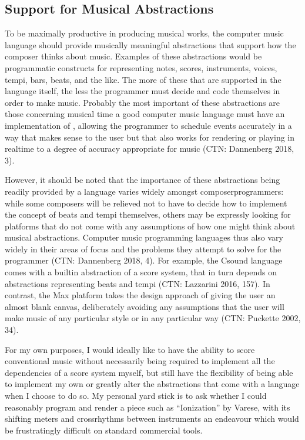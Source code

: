 \documentclass[letterpaper,10pt,english]{sphinxmanual}
\begin{document}
\subsection{Support for Musical Abstractions}
\label{\detokenize{background:support-for-musical-abstractions}}
\sphinxAtStartPar
To be maximally productive in producing musical works, the computer music language should provide
musically meaningful abstractions that support how the composer thinks about music.
Examples of these abstractions would be programmatic constructs for representing
notes, scores, instruments, voices, tempi, bars, beats, and the like.
The more of these that are supported in the language itself, the less the programmer
must decide and code themselves in order to make music.
Probably the most important of these abstractions are those concerning musical time
\sphinxhyphen{} a good computer music language must have an implementation of ,
allowing the programmer to schedule events accurately in a way that makes sense
to the user but that also works for rendering or playing in real\sphinxhyphen{}time to a degree of accuracy
appropriate for music (CTN: Dannenberg 2018, 3).

\sphinxAtStartPar
However, it should be noted that the importance of these abstractions being readily provided
by a language varies widely amongst composer\sphinxhyphen{}programmers:
while some composers will be relieved not to have to decide how to implement
the concept of beats and tempi themselves, others may be expressly looking for platforms
that do not come with any assumptions of how one might think about musical abstractions.
Computer music programming languages thus also vary widely in their areas
of focus and the problems they attempt to solve for the programmer (CTN: Dannenberg 2018, 4).
For example, the Csound language comes with a built\sphinxhyphen{}in abstraction of a score system,
that in turn depends on abstractions representing beats and tempi (CTN: Lazzarini 2016, 157).
In contrast, the Max platform takes the design approach of giving the user
an almost blank canvas, deliberately avoiding any assumptions that the user
will make music of any particular style or in any particular way (CTN: Puckette 2002, 34).

\sphinxAtStartPar
For my own purposes, I would ideally like to have the ability to score conventional music without
necessarily being required to implement all the dependencies of a score system myself,
but still have the flexibility of being able to implement my own or greatly alter the abstractions
that come with a language when I choose to do so.
My personal yard stick is to ask whether I could
reasonably program and render a piece such as “Ionization” by Varese, with its shifting
meters and cross\sphinxhyphen{}rhythms between instruments \sphinxhyphen{} an endeavour which would be frustratingly
difficult on standard commercial tools.
\end{document}
